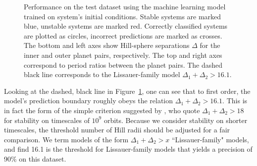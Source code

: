 \begin{figure}
 \centering {}
 \caption{
     Performance on the test dataset using the machine learning model trained on system's initial conditions.
     Stable systems are marked blue, unstable systems are marked red.  
     Correctly classified systems are plotted as circles, incorrect predictions are marked as crosses.
     The bottom and left axes show Hill-sphere separations $\Delta$ for the inner and outer planet pairs, respectively.
     The top and right axes correspond to period ratios between the planet pairs.
     The dashed black line corresponds to the Lissauer-family model $\Delta_1 + \Delta_2 > 16.1$.    
    \label{ariplot}}
\end{figure}

Looking at the dashed, black line in Figure~\ref{ariplot}, one can see that to first order, the model's prediction boundary roughly obeys the relation $\Delta_1 + \Delta_2 > 16.1$.
This is in fact the form of the simple criterion suggested by \cite{Lissauer2011}, who quote $\Delta_1 + \Delta_2 > 18$ for stability on timescales of $10^9$ orbits. 
Because we consider stability on shorter timescales, the threshold number of Hill radii should be adjusted for a fair comparison.
We term models of the form $\Delta_1 + \Delta_2 > x$ ``Lissauer-family" models, and find 16.1 is the threshold for Lissauer-family models that yields a precision of 90\% on this dataset.

